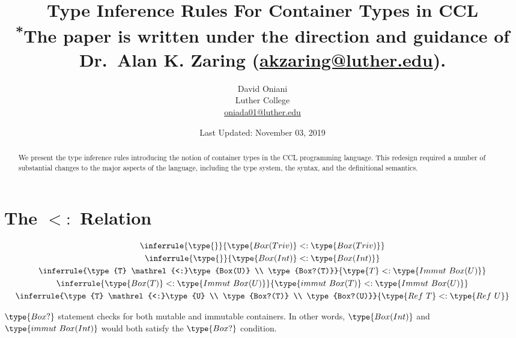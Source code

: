 \documentclass{article}
\author{David Oniani\\
        Luther College\\
        \href{mailto:oniada01@luther.edu}{oniada01@luther.edu}}
\title{\textbf{Type Inference Rules For Container Types in CCL}\\
       \medskip
       \small \textsuperscript{*}The paper is written under the direction and
       guidance of Dr.\ Alan K. Zaring
       (\href{mailto:akzaring@luther.edu}{akzaring@luther.edu}).}
\date{Last Updated: November 03, 2019}
\newcommand\subtype{\mathrel{<:}}
\begin{document}
\maketitle


\begin{abstract}
\noindent We present the type inference rules introducing the notion of
container types in the CCL programming language. This redesign required a
number of substantial changes to the major aspects of the language, including
the type system, the syntax, and the definitional semantics.
\end{abstract}


\section*{The $\subtype$ Relation}

\begin{gather}
  \inferrule{\type{}}{\type{Box(Triv)} \subtype \type{Box(Triv)}}\\
  \inferrule{\type{}}{\type{Box(Int)} \subtype \type{Box(Int)}}\\
  \inferrule{\type{T} \subtype \type{Box(U)} \\ \type{Box?(T)}}{\type{T} \subtype \type{Immut\ Box(U)}}\\
  \inferrule{\type{Box(T)} \subtype \type{Immut\ Box(U)}}{\type{immut\ Box(T)} \subtype \type{Immut\ Box(U)}}\\
  \inferrule{\type{T} \subtype \type{U} \\ \type{Box?(T)} \\ \type{Box?(U)}}{\type{Ref\ T} \subtype \type{Ref\ U}}
\end{gather}

$\type{Box?}$ statement checks for both mutable and immutable containers.
In other words, $\type{Box(Int)}$ and $\type{immut\ Box(Int)}$ would both
satisfy the $\type{Box?}$ condition.

\end{document}

